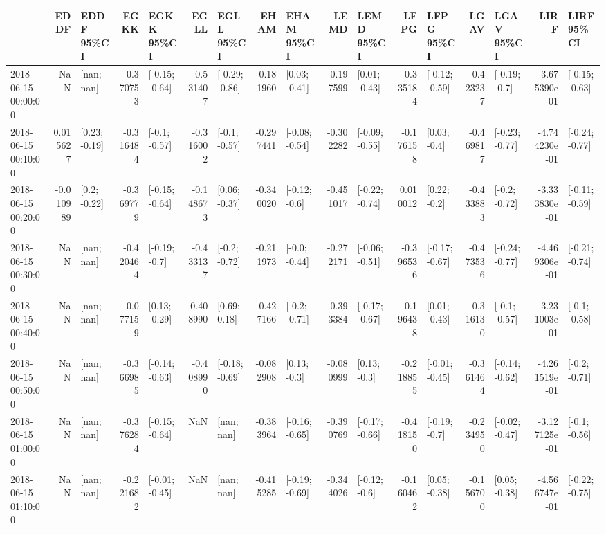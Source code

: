 \begin{tabular}{lrlrlrlrlrlrlrlrl}
\toprule
{} &      EDDF &      EDDF 95\%CI &      EGKK &      EGKK 95\%CI &      EGLL &      EGLL 95\%CI &      EHAM &      EHAM 95\%CI &      LEMD &      LEMD 95\%CI &      LFPG &      LFPG 95\%CI &      LGAV &      LGAV 95\%CI &          LIRF &      LIRF 95\%CI \\
\midrule
2018-06-15 00:00:00 &       NaN &      [nan; nan] & -0.370753 &  [-0.15; -0.64] & -0.531407 &  [-0.29; -0.86] & -0.181960 &   [0.03; -0.41] & -0.197599 &   [0.01; -0.43] & -0.335184 &  [-0.12; -0.59] & -0.423237 &   [-0.19; -0.7] & -3.675390e-01 &  [-0.15; -0.63] \\
2018-06-15 00:10:00 &  0.015627 &   [0.23; -0.19] & -0.316484 &   [-0.1; -0.57] & -0.316002 &   [-0.1; -0.57] & -0.297441 &  [-0.08; -0.54] & -0.302282 &  [-0.09; -0.55] & -0.176158 &    [0.03; -0.4] & -0.469817 &  [-0.23; -0.77] & -4.744230e-01 &  [-0.24; -0.77] \\
2018-06-15 00:20:00 & -0.010989 &    [0.2; -0.22] & -0.369779 &  [-0.15; -0.64] & -0.148673 &   [0.06; -0.37] & -0.340020 &   [-0.12; -0.6] & -0.451017 &  [-0.22; -0.74] &  0.010012 &    [0.22; -0.2] & -0.433883 &   [-0.2; -0.72] & -3.333830e-01 &  [-0.11; -0.59] \\
2018-06-15 00:30:00 &       NaN &      [nan; nan] & -0.420464 &   [-0.19; -0.7] & -0.433137 &   [-0.2; -0.72] & -0.211973 &   [-0.0; -0.44] & -0.272171 &  [-0.06; -0.51] & -0.396536 &  [-0.17; -0.67] & -0.473536 &  [-0.24; -0.77] & -4.469306e-01 &  [-0.21; -0.74] \\
2018-06-15 00:40:00 &       NaN &      [nan; nan] & -0.077159 &   [0.13; -0.29] &  0.408990 &    [0.69; 0.18] & -0.427166 &   [-0.2; -0.71] & -0.393384 &  [-0.17; -0.67] & -0.196438 &   [0.01; -0.43] & -0.316130 &   [-0.1; -0.57] & -3.231003e-01 &   [-0.1; -0.58] \\
2018-06-15 00:50:00 &       NaN &      [nan; nan] & -0.366985 &  [-0.14; -0.63] & -0.408990 &  [-0.18; -0.69] & -0.082908 &    [0.13; -0.3] & -0.080999 &    [0.13; -0.3] & -0.218855 &  [-0.01; -0.45] & -0.361464 &  [-0.14; -0.62] & -4.261519e-01 &   [-0.2; -0.71] \\
2018-06-15 01:00:00 &       NaN &      [nan; nan] & -0.376284 &  [-0.15; -0.64] &       NaN &      [nan; nan] & -0.383964 &  [-0.16; -0.65] & -0.390769 &  [-0.17; -0.66] & -0.418150 &   [-0.19; -0.7] & -0.234950 &  [-0.02; -0.47] & -3.127125e-01 &   [-0.1; -0.56] \\
2018-06-15 01:10:00 &       NaN &      [nan; nan] & -0.221682 &  [-0.01; -0.45] &       NaN &      [nan; nan] & -0.415285 &  [-0.19; -0.69] & -0.344026 &   [-0.12; -0.6] & -0.160462 &   [0.05; -0.38] & -0.156700 &   [0.05; -0.38] & -4.566747e-01 &  [-0.22; -0.75] \\

\end{tabular}
